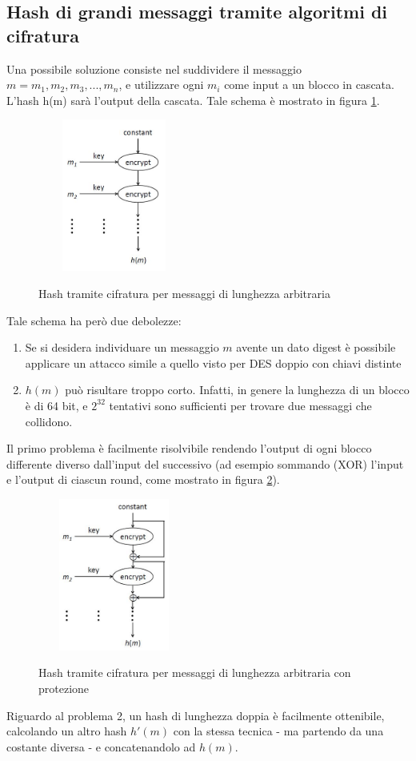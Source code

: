\subsection{Hash di grandi messaggi tramite algoritmi di cifratura}
Una possibile soluzione consiste nel suddividere il messaggio $m = m_{1},m_{2},m_{3},...,m_{n}$, e utilizzare ogni $m_{i}$ come input a un blocco in cascata. L'hash h(m) sarà l'output della cascata. Tale schema è mostrato in figura \ref{fig:hash_lung_ar}.
\begin{figure}
	\begin{center}
	{\includegraphics[height=5cm, width=5cm, keepaspectratio]{Immagini/hash/schema_des_come_hash_1.JPG}}
	\caption{Hash tramite cifratura per messaggi di lunghezza arbitraria \label{fig:hash_lung_ar}}
	\end{center}
\end{figure}
Tale schema ha però due debolezze:
\begin{enumerate}
\item Se si desidera individuare un messaggio $m$ avente un dato digest è possibile applicare un attacco simile a quello visto per DES doppio con chiavi distinte
\item $h(m)$ può risultare troppo corto. Infatti, in genere la lunghezza di un blocco è di 64 bit, e $2^{32}$ tentativi sono sufficienti per trovare due messaggi che collidono.
\end{enumerate}
Il primo problema è facilmente risolvibile rendendo l'output di ogni blocco differente diverso dall'input del successivo (ad esempio sommando (XOR) l'input e l'output di ciascun round, come mostrato in figura \ref{fig:hash_lung_ar_2}). 
\begin{figure}
	\begin{center}
	{\includegraphics[height=5cm, width=5cm, keepaspectratio]{Immagini/hash/schema_des_come_hash_2.JPG}}
	\caption{Hash tramite cifratura per messaggi di lunghezza arbitraria con protezione\label{fig:hash_lung_ar_2}}
	\end{center}
\end{figure}
\newline \newline
Riguardo al problema 2, un hash di lunghezza doppia è facilmente ottenibile, calcolando un altro hash $h'(m)$ con la stessa tecnica - ma partendo da una costante diversa - e concatenandolo ad $h(m)$.